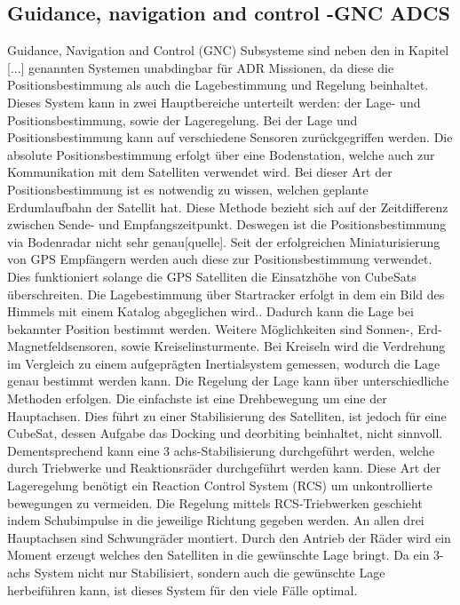 		\subsection{Guidance, navigation and control -GNC ADCS}%
		Guidance, Navigation and Control (GNC) Subsysteme sind neben den in Kapitel [...] genannten Systemen unabdingbar für ADR Missionen, da diese die Positionsbestimmung als auch die Lagebestimmung und Regelung beinhaltet. Dieses System kann in zwei Hauptbereiche unterteilt werden: der Lage- und Positionsbestimmung, sowie der Lageregelung.
Bei der Lage und Positionsbestimmung kann auf verschiedene Sensoren zurückgegriffen werden. Die absolute Positionsbestimmung erfolgt über eine Bodenstation, welche auch zur Kommunikation mit dem Satelliten verwendet wird. Bei dieser Art der Positionsbestimmung ist es notwendig zu wissen, welchen geplante Erdumlaufbahn der Satellit hat. Diese Methode bezieht sich auf der Zeitdifferenz zwischen Sende- und Empfangszeitpunkt. Deswegen ist die Positionsbestimmung via Bodenradar nicht sehr genau[quelle]. Seit der erfolgreichen Miniaturisierung  von GPS Empfängern werden auch diese zur Positionsbestimmung verwendet. Dies funktioniert solange die GPS Satelliten die Einsatzhöhe von CubeSats überschreiten. Die Lagebestimmung über Startracker erfolgt in dem ein Bild des Himmels mit einem Katalog abgeglichen wird.. Dadurch kann die Lage bei bekannter Position bestimmt werden. Weitere Möglichkeiten sind Sonnen-, Erd- Magnetfeldsensoren, sowie Kreiselinsturmente. Bei Kreiseln wird die Verdrehung im Vergleich zu einem aufgeprägten Inertialsystem gemessen, wodurch die Lage genau bestimmt werden kann. 
Die Regelung  der Lage kann über unterschiedliche Methoden erfolgen. Die einfachste ist eine Drehbewegung um eine der Hauptachsen. Dies führt zu einer Stabilisierung des Satelliten, ist jedoch für eine CubeSat, dessen Aufgabe das Docking und deorbiting beinhaltet, nicht sinnvoll. Dementsprechend kann eine 3 achs-Stabilisierung durchgeführt werden, welche durch Triebwerke und Reaktionsräder durchgeführt werden kann. Diese Art der Lageregelung benötigt ein Reaction Control System (RCS) um unkontrollierte bewegungen zu vermeiden. Die Regelung mittels RCS-Triebwerken geschieht indem Schubimpulse in die jeweilige Richtung gegeben werden. An allen drei Hauptachsen sind Schwungräder montiert. Durch den Antrieb der Räder wird ein Moment erzeugt welches den Satelliten in die gewünschte Lage bringt. Da ein 3-achs System nicht nur Stabilisiert, sondern auch die gewünschte Lage herbeiführen kann, ist dieses System für den viele Fälle optimal.

